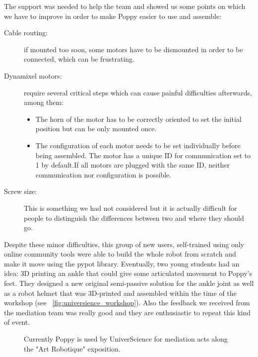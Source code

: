 The support was needed to help the team and showed us some points on which we have to improve in order to make Poppy easier to use and assemble:
\begin{description}
    \item[Cable routing:] if mounted too soon, some motors have to be dismounted in order to be connected, which can be frustrating.
    \item[Dynamixel motors:] require several critical steps which can cause painful difficulties afterwards, among them:
    \begin{itemize}
        \item The horn of the motor has to be correctly oriented to set the initial position but can be only mounted once.
        \item The configuration of each motor needs to be set individually before being assembled. The motor has a unique ID for communication set to 1 by default.If all motors are plugged with the same ID, neither communication nor configuration is possible.
    \end{itemize}
    \item[Screw size:] This is something we had not considered but it is actually difficult for people to distinguish the differences between two and where they should go.
\end{description}

Despite these minor difficulties, this group of new users, self-trained using only online community tools were able to build the whole robot from scratch and make it move using the pypot library. Eventually, two young students  had an idea: 3D printing an ankle that could give some articulated movement to Poppy's feet. They designed a new original semi-passive solution for the ankle joint as well as a robot helmet that was 3D-printed and assembled within the time of the workshop (see \figurename~\ref{fig:universience_workshop}). Also the feedback we received from the mediation team was really good and they are enthusiastic to repeat this kind of event.


\begin{figure}[tb]
\centering
    \hfill
    \caption{Currently Poppy is used by UniverScience for mediation acts along the "Art Robotique" exposition.}
    \label{fig:universcience_art}
\end{figure}

